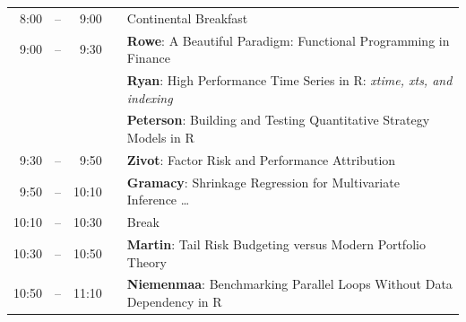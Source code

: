 \documentclass[letterpaper,10pt]{article}
\newcommand{\mylinecolor}[1]{\color{#1}\vspace{-8pt}}  %
\begin{document}
\begin{tabular}{rlrlp{5in}}
  8:00  & -- &  9:00 &   & \small{\mylinecolor{Breaks} Continental Breakfast}  \\
   9:00 & -- &  9:30 &   & \textbf{\color{LightningTalk} Rowe}: \small{A Beautiful Paradigm: Functional Programming in Finance} \\
          &    &         &   & \textbf{\color{LightningTalk} Ryan}: \small{High Performance Time Series in R: \emph{xtime, xts, and indexing}} \\
          &    &         &   & \textbf{\color{LightningTalk} Peterson}: \small{Building and Testing Quantitative Strategy Models in R} \\
  9:30  & -- &  9:50 &   & \textbf{\color{Talk} Zivot}: \small{Factor Risk and Performance Attribution} \\
  9:50  & -- &  10:10 &   & \textbf{\color{Talk} Gramacy}: \small{Shrinkage Regression for Multivariate Inference \ldots} \\ %
  10:10 & -- & 10:30 &   & \small{\mylinecolor{Breaks}  Break}  \\
  10:30  & -- &  10:50 &   & \textbf{\color{Talk} Martin}: \small{Tail Risk Budgeting versus Modern Portfolio Theory} \\
  10:50  & -- &  11:10 &   & \textbf{\color{Talk} Niemenmaa}: \small{Benchmarking Parallel Loops Without Data Dependency in R} \\

\end{tabular}
\end{document}
